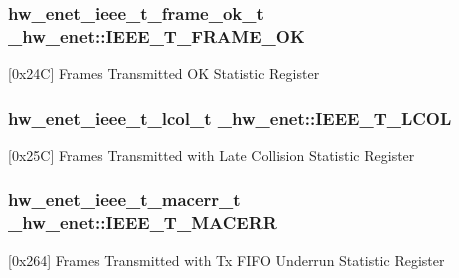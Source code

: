 \subsubsection[{\texorpdfstring{I\+E\+E\+E\+\_\+\+T\+\_\+\+F\+R\+A\+M\+E\+\_\+\+OK}{IEEE_T_FRAME_OK}}]{ {\bf hw\+\_\+enet\+\_\+ieee\+\_\+t\+\_\+frame\+\_\+ok\+\_\+t} \+\_\+hw\+\_\+enet\+::\+I\+E\+E\+E\+\_\+\+T\+\_\+\+F\+R\+A\+M\+E\+\_\+\+OK}\hypertarget{struct__hw__enet_aacfd247b7401b3ac54009df8d94faf0b}{}\label{struct__hw__enet_aacfd247b7401b3ac54009df8d94faf0b}
\mbox{[}0x24C\mbox{]} Frames Transmitted OK Statistic Register 
\subsubsection[{\texorpdfstring{I\+E\+E\+E\+\_\+\+T\+\_\+\+L\+C\+OL}{IEEE_T_LCOL}}]{ {\bf hw\+\_\+enet\+\_\+ieee\+\_\+t\+\_\+lcol\+\_\+t} \+\_\+hw\+\_\+enet\+::\+I\+E\+E\+E\+\_\+\+T\+\_\+\+L\+C\+OL}\hypertarget{struct__hw__enet_ae74c2a1ac0454ec88b61c37114e5a19a}{}\label{struct__hw__enet_ae74c2a1ac0454ec88b61c37114e5a19a}
\mbox{[}0x25C\mbox{]} Frames Transmitted with Late Collision Statistic Register 
\subsubsection[{\texorpdfstring{I\+E\+E\+E\+\_\+\+T\+\_\+\+M\+A\+C\+E\+RR}{IEEE_T_MACERR}}]{ {\bf hw\+\_\+enet\+\_\+ieee\+\_\+t\+\_\+macerr\+\_\+t} \+\_\+hw\+\_\+enet\+::\+I\+E\+E\+E\+\_\+\+T\+\_\+\+M\+A\+C\+E\+RR}\hypertarget{struct__hw__enet_ae95552267a671662fa63743f23dd25d5}{}\label{struct__hw__enet_ae95552267a671662fa63743f23dd25d5}
\mbox{[}0x264\mbox{]} Frames Transmitted with Tx F\+I\+FO Underrun Statistic Register 
